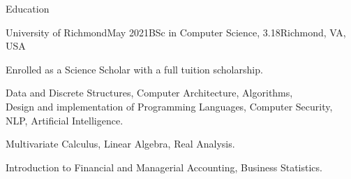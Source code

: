 \documentclass{resume} %
\begin{document}
\begin{rSection}{Education}
    \capsdef{////}{\scshape}{0.1pt}{2.5pt}{1pt}
    \begin{rSubsection}{University of Richmond}{May 2021}{BSc in Computer Science, \large{} 3.18}{Richmond, VA, USA}
    \item  Enrolled as a Science Scholar with a full tuition scholarship.
    \item {} Data and Discrete Structures, Computer Architecture, Algorithms,\\
        Design and implementation of Programming Languages, Computer Security, NLP, Artificial Intelligence.
    \item {} Multivariate Calculus, Linear Algebra, Real Analysis.
    \item {} Introduction to Financial and Managerial Accounting, Business Statistics.
    \end{rSubsection}

\end{rSection}

    





\end{document}
